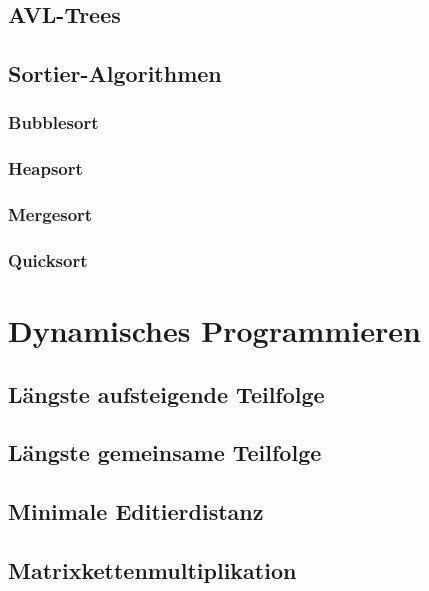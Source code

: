 \documentclass[a4paper]{article}
\begin{document}
\subsection{AVL-Trees}

\subsection{Sortier-Algorithmen}

    \subsubsection{Bubblesort}\label{alg:Bubblesort}
    

    \subsubsection{Heapsort}\label{alg:Heapsort}



    \subsubsection{Mergesort}\label{alg:Mergesort}



    \subsubsection{Quicksort}\label{alg:Quicksort}


\section{Dynamisches Programmieren}

\subsection{Längste aufsteigende Teilfolge}

\subsection{Längste gemeinsame Teilfolge}

\subsection{Minimale Editierdistanz}

\subsection{Matrixkettenmultiplikation}
\end{document}
